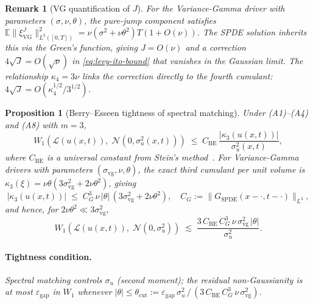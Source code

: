 \documentclass[review,12pt]{elsarticle}
\newtheorem{remark}{Remark}
\newtheorem{proposition}{Proposition}
\begin{document}
\begin{remark}[VG quantification of $J$]
\label{rem:vg-J}
For the Variance-Gamma driver with parameters $(\sigma,\nu,\theta)$,
the pure-jump component satisfies
$\mathbb{E}\|\xi_{\mathrm{VG}}^J\|^2_{L^2([0,T])}=\nu(\sigma^2+\nu\theta^2)T(1+O(\nu))$.
The SPDE solution inherits this via the Green's function, giving
$J=O(\nu)$ and a correction $4\sqrt{J}=O(\sqrt\nu)$ in
\eqref{eq:levy-ito-bound} that vanishes in the Gaussian limit.
The relationship $\kappa_4=3\nu$ links the correction directly to the
fourth cumulant: $4\sqrt{J}=O(\kappa_4^{1/2}/3^{1/2})$.
\end{remark}

\begin{proposition}[Berry--Esseen tightness of spectral matching]
\label{cor:berry-esseen}
Under (A1)--(A4) and (A8) with $m=3$,
\begin{equation}
\label{eq:be-bound}
W_1\!\left(\mathcal{L}(u(x,t)),\;\mathcal{N}(0,\sigma_u^2(x,t))\right)
\;\le\;
C_{\mathrm{BE}}\,\frac{|\kappa_3(u(x,t))|}{\sigma_u^2(x,t)},
\end{equation}
where $C_{\mathrm{BE}}$ is a universal constant from Stein's
method~\cite{ChenGoldsteinShao2011}. For Variance-Gamma drivers with
parameters $(\sigma_{\mathrm{vg}},\nu,\theta)$, the exact third cumulant
per unit volume is $\kappa_3(\xi)=\nu\theta(3\sigma_{\mathrm{vg}}^2+2\nu\theta^2)$,
giving
\begin{equation}
\label{eq:kappa3-vg}
|\kappa_3(u(x,t))|\;\le\;
C_G^3\,\nu\,|\theta|\,(3\sigma_{\mathrm{vg}}^2+2\nu\theta^2),\quad
C_G:=\|G_{\mathrm{SPDE}}(x-\cdot,t-\cdot)\|_{L^3},
\end{equation}
and hence, for $2\nu\theta^2\ll 3\sigma_{\mathrm{vg}}^2$,
\begin{equation}
\label{eq:be-vg}
W_1\!\left(\mathcal{L}(u(x,t)),\;\mathcal{N}(0,\sigma_u^2)\right)
\;\lesssim\;
\frac{3\,C_{\mathrm{BE}}\,C_G^3\,\nu\,\sigma_{\mathrm{vg}}^2\,|\theta|}{\sigma_u^2}.
\end{equation}
\paragraph{Tightness condition.} Spectral matching controls $\sigma_u$
(second moment); the residual non-Gaussianity is at most
$\varepsilon_{\mathrm{gap}}$ in $W_1$ whenever
$|\theta|\le\theta_{\mathrm{cut}}:=
\varepsilon_{\mathrm{gap}}\,\sigma_u^2\,/\,
(3\,C_{\mathrm{BE}}\,C_G^3\,\nu\,\sigma_{\mathrm{vg}}^2)$.
\end{proposition}
\end{document}
